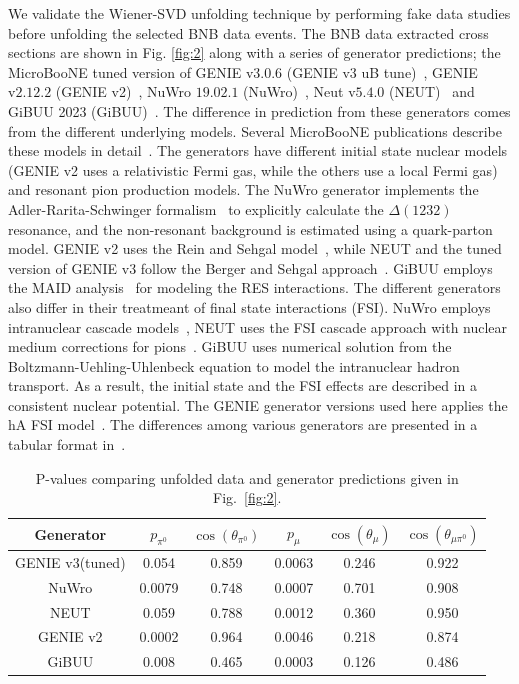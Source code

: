 \documentclass[%
 reprint,
 amsmath,amssymb, longbibliography,
 aps, 
 prd,
 twocolumn,
 showpacs,
 superscriptaddress
]{revtex4-2}
\begin{document}
We validate the Wiener-SVD unfolding technique by performing fake data studies before unfolding the selected BNB data events. 
The BNB data extracted cross sections are shown in Fig. \ref{fig:2} along with a series of generator predictions; the MicroBooNE tuned version of GENIE $\text{v3.0.6}$ (GENIE v3 uB tune)~\cite{PhysRevD.105.072001}, GENIE $\text{v2.12.2}$ (GENIE v2)~\cite{ANDREOPOULOS201087, andreopoulos2015genie}, NuWro $\text{19.02.1}$ (NuWro)~\cite{GOLAN2012499, PhysRevC.86.015505}, Neut $\text{v5.4.0}$ (NEUT)~\cite{Hayato:2009zz, NEUT} and GiBUU 2023 (GiBUU)~\cite{BUSS20121}. The difference in prediction from these generators comes from the different underlying models. Several MicroBooNE publications describe these models in detail~\cite{PhysRevLett.125.201803, PhysRevD.105.L051102, PhysRevD.102.112013}. The generators have different initial state nuclear models (GENIE v2 uses a relativistic Fermi gas, while the others use a local Fermi gas) and resonant pion production models. The NuWro generator implements the Adler-Rarita-Schwinger formalism~\cite{PhysRevD.80.093001} to explicitly calculate the $\Delta (1232)$ resonance, and the non-resonant background is estimated using a quark-parton model. GENIE v2 uses the Rein and Sehgal model~\cite{REIN198179}, while NEUT and the tuned version of GENIE v3 follow the Berger and Sehgal approach~\cite{10.1063/1.3274164,PhysRevD.76.113004,PhysRevD.79.079903}. GiBUU employs the MAID analysis~\cite{Mosel_2019} for modeling the RES interactions. The different generators also differ in their treatmeant of final state interactions (FSI). NuWro employs intranuclear cascade models~\cite{PhysRevC.86.015505}, NEUT uses the FSI cascade approach with nuclear medium corrections for pions~\cite{SALCEDO1988557}. GiBUU uses numerical solution from the Boltzmann-Uehling-Uhlenbeck equation to model the intranuclear hadron transport. As a result, the initial state and the FSI effects are described in a consistent nuclear potential. The GENIE generator versions used here applies the hA FSI model~\cite{10.1063/1.3661588,10.1063/1.4931864}. The differences among various generators are presented in a tabular format in~\cite{acero2021measurement}.  
\begin{table}[h]
    \begin{ruledtabular}
    \begin{tabular}{cccccc}
    Generator & $p_{\pi^0}$ & $\cos(\theta_{\pi^0})$ & $p_{\mu}$ & $\cos(\theta_{\mu})$ & $\cos(\theta_{\mu\pi^0})$\\
      \hline
         GENIE v3(tuned) & 0.054 & 0.859 & 0.0063 & 0.246 & 0.922 \\
         NuWro & 0.0079 & 0.748 & 0.0007 & 0.701 & 0.908 \\
         NEUT & 0.059 & 0.788 & 0.0012 & 0.360 & 0.950 \\
         GENIE v2 & 0.0002 & 0.964 & 0.0046 & 0.218 & 0.874 \\
         GiBUU & 0.008 & 0.465 & 0.0003 & 0.126 & 0.486 \\
    \end{tabular}
    \end{ruledtabular}
    \caption{ P-values comparing unfolded data and generator predictions given in Fig.~\ref{fig:2}.}
    \label{tab:my_label}
\end{table}
\end{document}
